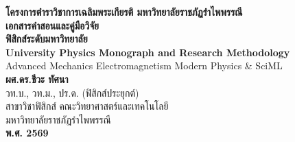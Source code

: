 \begin{titlepage}
\centering
\vspace*{2.0cm}

{\Large\bfseries\color{physicsblue} โครงการตำราวิชาการเฉลิมพระเกียรติ มหาวิทยาลัยราชภัฏรำไพพรรณี}\\[1.5cm]

{\Huge\bfseries\color{physicsnavy} เอกสารคำสอนและคู่มือวิจัย}\\[0.5cm]
{\Huge\bfseries\color{physicsblue} ฟิสิกส์ระดับมหาวิทยาลัย}\\[0.8cm]

{\LARGE\bfseries University Physics Monograph and Research Methodology}\\[0.4cm]
{\large\textsf{Advanced Mechanics \enspace\textbullet\enspace Electromagnetism \enspace\textbullet\enspace Modern Physics \& SciML}}\\[2.5cm]

{\Large\bfseries ผศ.ดร.ชีวะ ทัศนา}\\[0.3cm]
{\large วท.บ., วท.ม., ปร.ด. (ฟิสิกส์ประยุกต์)}\\[0.2cm]
{\normalsize สาขาวิชาฟิสิกส์ คณะวิทยาศาสตร์และเทคโนโลยี}\\[0.2cm]
{\normalsize มหาวิทยาลัยราชภัฏรำไพพรรณี}\\[2.5cm]

\vfill
{\large\bfseries พ.ศ. 2569}
\end{titlepage}
